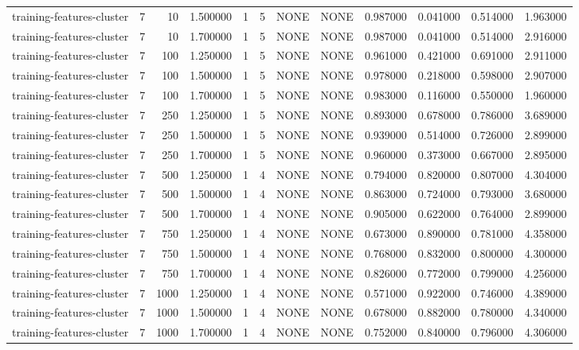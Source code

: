 \begin{tabular}{lrrrllllrrrr}
training-features-cluster & 7 & 10 & 1.500000 & 1 & 5 & NONE & NONE & 0.987000 & 0.041000 & 0.514000 & 1.963000 \\
training-features-cluster & 7 & 10 & 1.700000 & 1 & 5 & NONE & NONE & 0.987000 & 0.041000 & 0.514000 & 2.916000 \\
training-features-cluster & 7 & 100 & 1.250000 & 1 & 5 & NONE & NONE & 0.961000 & 0.421000 & 0.691000 & 2.911000 \\
training-features-cluster & 7 & 100 & 1.500000 & 1 & 5 & NONE & NONE & 0.978000 & 0.218000 & 0.598000 & 2.907000 \\
training-features-cluster & 7 & 100 & 1.700000 & 1 & 5 & NONE & NONE & 0.983000 & 0.116000 & 0.550000 & 1.960000 \\
training-features-cluster & 7 & 250 & 1.250000 & 1 & 5 & NONE & NONE & 0.893000 & 0.678000 & 0.786000 & 3.689000 \\
training-features-cluster & 7 & 250 & 1.500000 & 1 & 5 & NONE & NONE & 0.939000 & 0.514000 & 0.726000 & 2.899000 \\
training-features-cluster & 7 & 250 & 1.700000 & 1 & 5 & NONE & NONE & 0.960000 & 0.373000 & 0.667000 & 2.895000 \\
training-features-cluster & 7 & 500 & 1.250000 & 1 & 4 & NONE & NONE & 0.794000 & 0.820000 & 0.807000 & 4.304000 \\
training-features-cluster & 7 & 500 & 1.500000 & 1 & 4 & NONE & NONE & 0.863000 & 0.724000 & 0.793000 & 3.680000 \\
training-features-cluster & 7 & 500 & 1.700000 & 1 & 4 & NONE & NONE & 0.905000 & 0.622000 & 0.764000 & 2.899000 \\
training-features-cluster & 7 & 750 & 1.250000 & 1 & 4 & NONE & NONE & 0.673000 & 0.890000 & 0.781000 & 4.358000 \\
training-features-cluster & 7 & 750 & 1.500000 & 1 & 4 & NONE & NONE & 0.768000 & 0.832000 & 0.800000 & 4.300000 \\
training-features-cluster & 7 & 750 & 1.700000 & 1 & 4 & NONE & NONE & 0.826000 & 0.772000 & 0.799000 & 4.256000 \\
training-features-cluster & 7 & 1000 & 1.250000 & 1 & 4 & NONE & NONE & 0.571000 & 0.922000 & 0.746000 & 4.389000 \\
training-features-cluster & 7 & 1000 & 1.500000 & 1 & 4 & NONE & NONE & 0.678000 & 0.882000 & 0.780000 & 4.340000 \\
training-features-cluster & 7 & 1000 & 1.700000 & 1 & 4 & NONE & NONE & 0.752000 & 0.840000 & 0.796000 & 4.306000 \\

\end{tabular}
